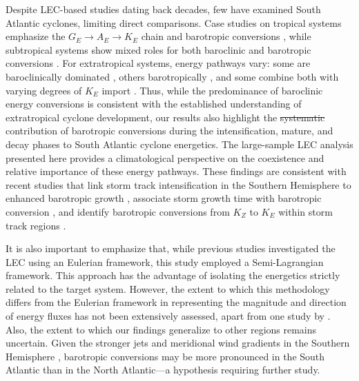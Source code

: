 \documentclass[pdflatex,sn-chicago]{sn-jnl}%
\makeatletter
\theoremstyle{plain}
\theoremstyle{definition}
\theoremstyle{remark}
\theoremstyle{definition}
\providecommand{\DIFaddtex}[1]{{\protect\color{blue}#1}} %
\providecommand{\DIFdeltex}[1]{{\protect\color{red}\sout{#1}}} %
\providecommand{\DIFaddbegin}{} %
\providecommand{\DIFaddend}{} %
\providecommand{\DIFdelbegin}{} %
\providecommand{\DIFdelend}{} %
\providecommand{\DIFadd}[1]{\texorpdfstring{\DIFaddtex{#1}}{#1}} %
\providecommand{\DIFdel}[1]{\texorpdfstring{\DIFdeltex{#1}}{}} %
\let\sout@orig\sout %
\renewcommand{\sout}[1]{\ifmmode\text{\sout@orig{\ensuremath{#1}}}\else\sout@orig{#1}\fi} %
\makeatother
\begin{document}
Despite LEC-based studies dating back decades, few have examined South Atlantic cyclones, limiting direct comparisons. Case studies on tropical systems emphasize the $G_E \rightarrow A_E \rightarrow K_E$ chain and barotropic conversions \citep{brennan1980zonal,veiga2008analysis}, while subtropical systems show mixed roles for both baroclinic and barotropic conversions \citep{michaelides1987limited,dias2013synoptic,pezza2014large,cavicchia2018energetics}. For extratropical systems, energy pathways vary: some are baroclinically dominated \citep{dias2011energy,black2013universal}, others barotropically \citep{michaelides1992spatial,dias2011energy}, and some combine both with varying degrees of $K_E$ import \citep{wahab2002mechanism,bulic2006limited,pezza2010environmental}. Thus, while the predominance of baroclinic energy conversions is consistent with the established understanding of extratropical cyclone development, our results also highlight the \DIFdelbegin \DIFdel{systematic }\DIFdelend contribution of barotropic conversions \DIFaddbegin \DIFadd{during the intensification, mature, and decay phases }\DIFaddend to South Atlantic cyclone energetics. The large-sample LEC analysis presented here provides a climatological perspective on the coexistence and relative importance of these energy pathways. These findings are consistent with recent studies that link storm track intensification in the Southern Hemisphere to enhanced barotropic growth \citep{chemke2022intensification}, associate storm growth time with barotropic conversion \citep{hadas2025lagrangian}, and identify barotropic conversions from $K_Z$ to $K_E$ within storm track regions \citep{liu2024systematic}.

It is also important to emphasize that, while previous studies investigated the LEC using an Eulerian framework, this study employed a Semi-Lagrangian framework. This approach has the advantage of isolating the energetics strictly related to the target system. However, the extent to which this methodology differs from the Eulerian framework in representing the magnitude and direction of energy fluxes has not been extensively assessed, apart from one study by \citet{michaelides1999quasi}. Also, the extent to which our findings generalize to other regions remains uncertain. Given the stronger jets and meridional wind gradients in the Southern Hemisphere \citep[e.g.,][]{swart2019canadian,jain2023monsoon,savita2023assessment}, barotropic conversions may be more pronounced in the South Atlantic than in the North Atlantic—a hypothesis requiring further study.
\end{document}
